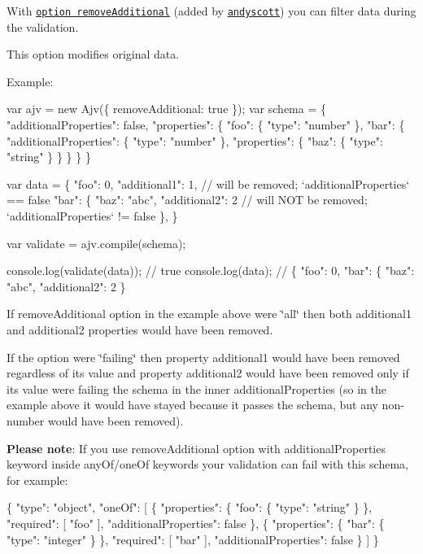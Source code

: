 With \href{#options}{\tt option {\ttfamily remove\+Additional}} (added by \href{https://github.com/andyscott}{\tt andyscott}) you can filter data during the validation.

This option modifies original data.

Example\+:


\begin{DoxyCode}
var ajv = new Ajv(\{ removeAdditional: true \});
var schema = \{
  "additionalProperties": false,
  "properties": \{
    "foo": \{ "type": "number" \},
    "bar": \{
      "additionalProperties": \{ "type": "number" \},
      "properties": \{
        "baz": \{ "type": "string" \}
      \}
    \}
  \}
\}

var data = \{
  "foo": 0,
  "additional1": 1, // will be removed; `additionalProperties` == false
  "bar": \{
    "baz": "abc",
    "additional2": 2 // will NOT be removed; `additionalProperties` != false
  \},
\}

var validate = ajv.compile(schema);

console.log(validate(data)); // true
console.log(data); // \{ "foo": 0, "bar": \{ "baz": "abc", "additional2": 2 \}
\end{DoxyCode}


If {\ttfamily remove\+Additional} option in the example above were {\ttfamily \char`\"{}all\char`\"{}} then both {\ttfamily additional1} and {\ttfamily additional2} properties would have been removed.

If the option were {\ttfamily \char`\"{}failing\char`\"{}} then property {\ttfamily additional1} would have been removed regardless of its value and property {\ttfamily additional2} would have been removed only if its value were failing the schema in the inner {\ttfamily additional\+Properties} (so in the example above it would have stayed because it passes the schema, but any non-\/number would have been removed).

{\bfseries Please note}\+: If you use {\ttfamily remove\+Additional} option with {\ttfamily additional\+Properties} keyword inside {\ttfamily any\+Of}/{\ttfamily one\+Of} keywords your validation can fail with this schema, for example\+:


\begin{DoxyCode}
\{
  "type": "object",
  "oneOf": [
    \{
      "properties": \{
        "foo": \{ "type": "string" \}
      \},
      "required": [ "foo" ],
      "additionalProperties": false
    \},
    \{
      "properties": \{
        "bar": \{ "type": "integer" \}
      \},
      "required": [ "bar" ],
      "additionalProperties": false
    \}
  ]
\}
\end{DoxyCode}


